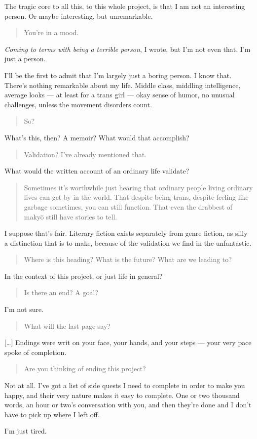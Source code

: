 The tragic core to all this, to this whole project, is that I am not an interesting person. Or maybe interesting, but unremarkable.

\begin{quote}
You're in a mood.
\end{quote}

\emph{Coming to terms with being a terrible person}, I wrote, but I'm not even that. I'm just a person.

I'll be the first to admit that I'm largely just a boring person. I know that. There's nothing remarkable about my life. Middle class, middling intelligence, average looks --- at least for a trans girl --- okay sense of humor, no unusual challenges, unless the movement disorders count.

\begin{quote}
So?
\end{quote}

What's this, then? A memoir? What would that accomplish?

\begin{quote}
Validation? I've already mentioned that.
\end{quote}

What would the written account of an ordinary life validate?

\begin{quote}
Sometimes it's worthwhile just hearing that ordinary people living ordinary lives can get by in the world. That despite being trans, despite feeling like garbage sometimes, you can still function. That even the drabbest of makyō still have stories to tell.
\end{quote}

I suppose that's fair. Literary fiction exists separately from genre fiction, as silly a distinction that is to make, because of the validation we find in the unfantastic.

\begin{quote}
Where is this heading? What is the future? What are we leading to?
\end{quote}

In the context of this project, or just life in general?

\begin{quote}
Is there an end? A goal?
\end{quote}

I'm not sure.

\begin{quote}
What will the last page say?
\end{quote}

{[}\ldots{}{]} Endings were writ on your face, your hands, and your steps --- your very pace spoke of completion.

\begin{quote}
Are you thinking of ending this project?
\end{quote}

Not at all. I've got a list of side quests I need to complete in order to make you happy, and their very nature makes it easy to complete. One or two thousand words, an hour or two's conversation with you, and then they're done and I don't have to pick up where I left off.

I'm just tired.
